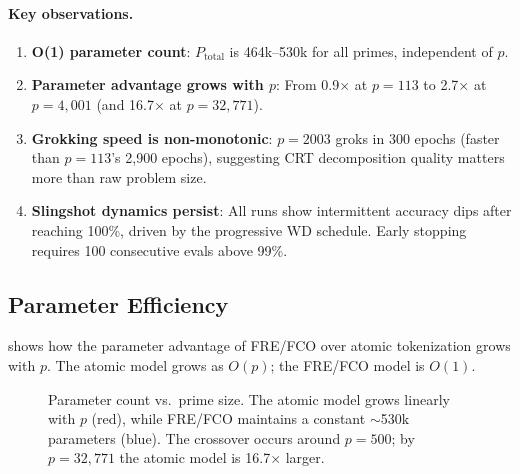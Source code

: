 \documentclass[11pt]{article}
\newcommand{\Ptotal}{P_{\mathrm{total}}}
\begin{document}
\paragraph{Key observations.}
\begin{enumerate}[leftmargin=*]
    \item \textbf{O(1) parameter count}: $\Ptotal$ is 464k--530k for all primes, independent of $p$.
    \item \textbf{Parameter advantage grows with $p$}: From 0.9$\times$ at $p = 113$ to 2.7$\times$ at $p = 4{,}001$ (and 16.7$\times$ at $p = 32{,}771$).
    \item \textbf{Grokking speed is non-monotonic}: $p = 2003$ groks in 300 epochs (faster than $p = 113$'s 2,900 epochs), suggesting CRT decomposition quality matters more than raw problem size.
    \item \textbf{Slingshot dynamics persist}: All runs show intermittent accuracy dips after reaching 100\%, driven by the progressive WD schedule. Early stopping requires 100 consecutive evals above 99\%.
\end{enumerate}

\subsection{Parameter Efficiency}
\label{sec:params}

 shows how the parameter advantage of FRE/FCO over atomic tokenization grows with $p$. The atomic model grows as $O(p)$; the FRE/FCO model is $O(1)$.

\begin{figure}[t]
\centering
{}
\caption{Parameter count vs.\ prime size. The atomic model grows linearly with $p$ (red), while FRE/FCO maintains a constant $\sim$530k parameters (blue). The crossover occurs around $p = 500$; by $p = 32{,}771$ the atomic model is 16.7$\times$ larger.}
\label{fig:param_scaling}
\end{figure}
\end{document}
